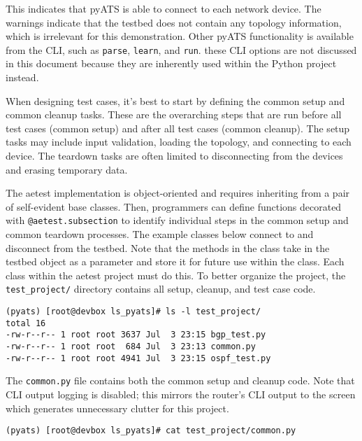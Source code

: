 This indicates that pyATS is able to connect to each network device. The
warnings indicate that the testbed does not contain any topology information,
which is irrelevant for this demonstration. Other pyATS functionality is
available from the CLI, such as \verb|parse|, \verb|learn|, and \verb|run|.
these CLI options are not discussed in this document because they are
inherently used within the Python project instead.

When designing test cases, it's best to start by defining the common setup
and common cleanup tasks. These are the overarching steps that are run before
all test cases (common setup) and after all test cases (common cleanup). The
setup tasks may include input validation, loading the topology, and connecting
to each device. The teardown tasks are often limited to disconnecting from the
devices and erasing temporary data.

The aetest implementation is object-oriented and requires inheriting from a
pair of self-evident base classes. Then, programmers can define functions
decorated with \verb|@aetest.subsection| to identify individual steps in the
common setup and common teardown processes. The example classes below
connect to and disconnect from the testbed. Note that the methods in the
class take in the testbed object as a parameter and store it for future use
within the class. Each class within the aetest project must do this. To better
organize the project, the \verb|test_project/| directory contains all setup,
cleanup, and test case code.

\begin{verbatim}
(pyats) [root@devbox ls_pyats]# ls -l test_project/
total 16
-rw-r--r-- 1 root root 3637 Jul  3 23:15 bgp_test.py
-rw-r--r-- 1 root root  684 Jul  3 23:13 common.py
-rw-r--r-- 1 root root 4941 Jul  3 23:15 ospf_test.py
\end{verbatim}

The \verb|common.py| file contains both the common setup and cleanup code.
Note that CLI output logging is disabled; this mirrors the router's CLI
output to the screen which generates unnecessary clutter for this project.

\begin{verbatim}
(pyats) [root@devbox ls_pyats]# cat test_project/common.py
\end{verbatim}

